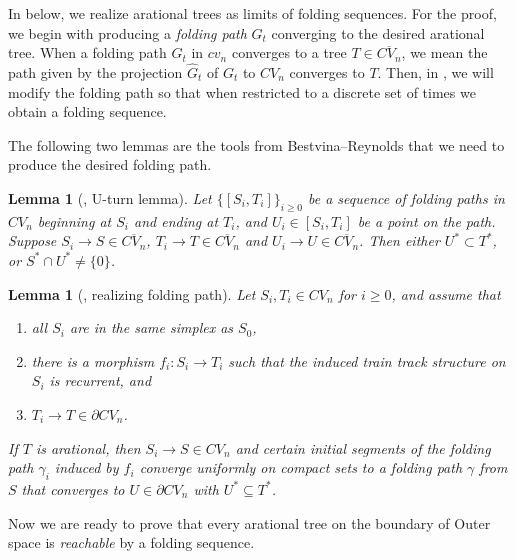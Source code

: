 \documentclass[11pt, letterpaper]{amsart}
\theoremstyle{plain}
\newtheorem{lemma}[theorem]{Lemma}
\theoremstyle{definition}
\newcommand{\ov}[1]{\overline{#1}}
\begin{document}
In  below, we realize arational trees as limits of folding sequences. 
For the proof, we begin with producing a {\it folding path} $G_t$ converging to the desired
arational tree. 
 When a folding path $G_t$ in $cv_n$ converges to a tree $T
 \in \ov{CV_n}$, we mean the path given by the projection 
 $\hat{G}_t$ of $G_t$ to $CV_n$ converges to $T$.
Then, in , we will modify the folding path so that when
restricted to a discrete set of times we obtain a folding sequence.

The following two lemmas are the tools from Bestvina--Reynolds
\cite{bestvina2015boundary} that we need to produce the desired folding path.
\begin{lemma}[{\cite[Theorem 6.6]{bestvina2015boundary}}, U-turn lemma]
  \label{lem:U-turn}
  Let $\{[S_i, T_i]\}_{i \ge 0}$ be a sequence of folding paths in $CV_n$ beginning at $S_i$ and ending at $T_i$, and $U_i \in [S_i,T_i]$
  be a point on the path. Suppose $S_i \to S \in \ov{CV_n}$, $T_i \to T \in
  \ov{CV_n}$ and $U_i \to U \in \ov{CV_n}$. Then either $U^* \subset T^*$, or
  $S^* \cap U^* \neq \{0\}$.
\end{lemma}

\begin{lemma}[{\cite[Lemma 7.3]{bestvina2015boundary}}, realizing folding path]
  \label{lem:realizing_folding}
  Let $S_i,T_i \in CV_n$ for $i \ge 0$, and assume that
  \begin{enumerate}[label=(\alph*)]
  \item all $S_i$ are in the same simplex as $S_0$, 
  \item there is a morphism $f_i : S_i \to T_i$ such that the induced train track
    structure on $S_i$ is recurrent, and
  \item $T_i \to T \in \partial CV_n$.
  \end{enumerate}
  If $T$ is arational, then $S_i \to S \in CV_n$ and certain initial segments of the folding path
  $\gamma_i$ induced  by $f_i$ converge uniformly on compact sets to a folding
  path $\gamma$ from $S$ that converges to $U \in \partial CV_n$ with $U^*
  \subseteq T^*$.
  \end{lemma}

Now we are ready to prove that every arational tree on
the boundary of Outer space is \emph{reachable} by a folding
sequence.
\end{document}
